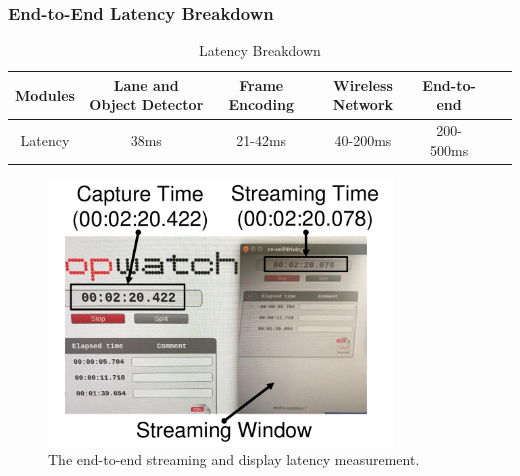\subsubsection{End-to-End Latency Breakdown}


\begin{table}[ht]
  \centering
  \caption[latency]{Latency Breakdown}
  \vspace{-0.0cm}
  \label{latency}
  \begin{tabular}{|c|c|c|c|c|c|c|}
  \hline
Modules & Lane and Object Detector  &  Frame Encoding  &  Wireless Network  & End-to-end  
\\  \hline
Latency & 38ms  & 21-42ms &  40-200ms & 200-500ms
\\  \hline      
  \end{tabular}
  \vspace{-0.0cm}
\end{table}


\begin{figure}[ht]
\centering
\vspace{-0.0cm}
\includegraphics[width=3.6in,angle=0]{Figs/RTDrive/evaluation/endtoend.pdf}
\vspace{-0.2cm}
\caption{The end-to-end streaming and display latency measurement.}
\vspace{-0.2cm}
\label{endtoend}
\centering
\end{figure}


